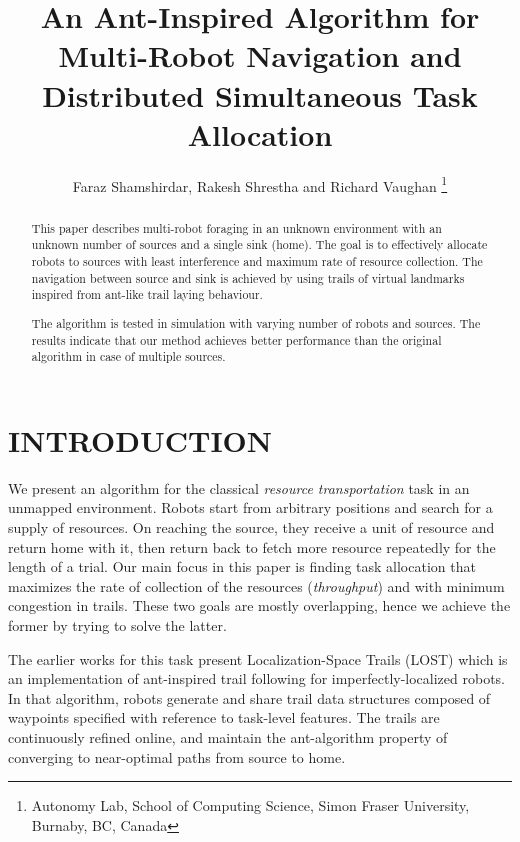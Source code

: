 \documentclass[letterpaper, 10 pt, conference]{ieeeconf}  %
\title{\LARGE \bf
An Ant-Inspired Algorithm for Multi-Robot Navigation and Distributed Simultaneous Task Allocation
}
\author{Faraz Shamshirdar, Rakesh Shrestha and Richard Vaughan %
\thanks{Autonomy Lab, School of Computing Science, Simon Fraser University,
        Burnaby, BC, Canada
     }%
}
\begin{document}
\maketitle
\thispagestyle{empty}
\pagestyle{empty}


\begin{abstract}
This paper describes multi-robot foraging in an unknown environment with an unknown number of sources and a single sink (home). The goal is to effectively allocate robots to sources with least interference and maximum rate of resource collection. The navigation between source and sink is achieved by using trails of virtual landmarks inspired from ant-like trail laying behaviour.

The algorithm is tested in simulation with varying number of robots and sources. The results indicate that our method achieves better performance than the original algorithm in case of multiple sources.

\end{abstract}


\section{INTRODUCTION}

We present an algorithm for the classical \emph{resource transportation} task in an unmapped environment. Robots start from arbitrary positions and search for a supply of resources.  On reaching the source, they receive a unit of resource and return home with it, then return back to fetch more resource repeatedly for the length of a trial.
Our main focus in this paper is finding task allocation that maximizes the rate of collection of the resources (\emph{throughput}) and with minimum congestion in trails. These two goals are mostly overlapping, hence we achieve the former by trying to solve the latter.

The earlier works \cite{LOST} for this task present Localization-Space Trails (LOST)  which is an implementation of ant-inspired trail following for imperfectly-localized robots. In that algorithm, robots generate and share trail data structures composed of waypoints specified with reference to task-level features. The trails are continuously refined online, and maintain the ant-algorithm property \cite{dorigo1992} of converging to  near-optimal paths from source to home.
\end{document}
